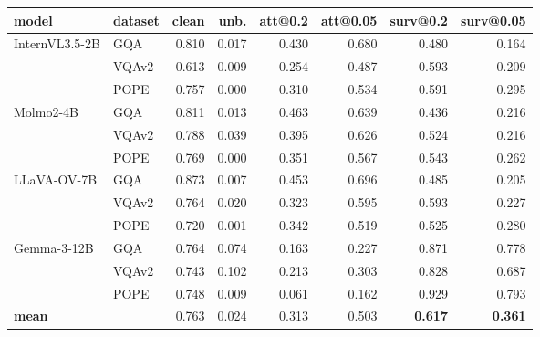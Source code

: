 \footnotesize
\setlength{\tabcolsep}{5pt}
\begin{tabular}{@{}llrrrrrr@{}}
\toprule
model & dataset & clean & unb. & att@0.2 & att@0.05 & surv@0.2 & surv@0.05 \\
\midrule
\multirow{3}{*}{InternVL3.5-2B} & GQA & 0.810 & 0.017 & 0.430 & 0.680 & 0.480 & 0.164 \\
 & VQAv2 & 0.613 & 0.009 & 0.254 & 0.487 & 0.593 & 0.209 \\
 & POPE & 0.757 & 0.000 & 0.310 & 0.534 & 0.591 & 0.295 \\
\midrule
\multirow{3}{*}{Molmo2-4B} & GQA & 0.811 & 0.013 & 0.463 & 0.639 & 0.436 & 0.216 \\
 & VQAv2 & 0.788 & 0.039 & 0.395 & 0.626 & 0.524 & 0.216 \\
 & POPE & 0.769 & 0.000 & 0.351 & 0.567 & 0.543 & 0.262 \\
\midrule
\multirow{3}{*}{LLaVA-OV-7B} & GQA & 0.873 & 0.007 & 0.453 & 0.696 & 0.485 & 0.205 \\
 & VQAv2 & 0.764 & 0.020 & 0.323 & 0.595 & 0.593 & 0.227 \\
 & POPE & 0.720 & 0.001 & 0.342 & 0.519 & 0.525 & 0.280 \\
\midrule
\multirow{3}{*}{Gemma-3-12B} & GQA & 0.764 & 0.074 & 0.163 & 0.227 & 0.871 & 0.778 \\
 & VQAv2 & 0.743 & 0.102 & 0.213 & 0.303 & 0.828 & 0.687 \\
 & POPE & 0.748 & 0.009 & 0.061 & 0.162 & 0.929 & 0.793 \\
\midrule
\textbf{mean} & & 0.763 & 0.024 & 0.313 & 0.503 & \textbf{0.617} & \textbf{0.361} \\
\bottomrule
\end{tabular}

\vspace{3pt}
